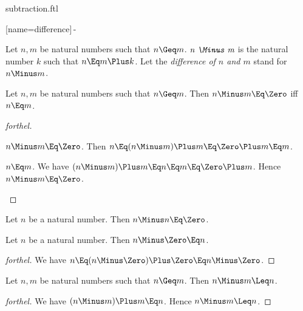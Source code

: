 \documentclass{stex}
\begin{document}
\begin{smodule}{subtraction.ftl}


[name=difference]{\,-\,}


\begin{definition*}[forthel,for=difference]
  Let $n, m$ be natural numbers such that $n \Geq m$.
  $\emph{n \Minus m}$ is the natural number $k$ such that $n \Eq m \Plus k$.
  Let the \emph{difference of $n$ and $m$} stand for $n \Minus m$.
\end{definition*}

\begin{proposition*}[forthel]
  Let $n, m$ be natural numbers such that $n \Geq m$.
  Then $n \Minus m \Eq \Zero$ iff $n \Eq m$.
\end{proposition*}
\begin{proof}[forthel]
  \begin{case}{$n \Minus m \Eq \Zero$.}
    Then $n
      \Eq (n \Minus m) \Plus m
      \Eq \Zero \Plus m
      \Eq m$.
  \end{case}

  \begin{case}{$n \Eq m$.}
    We have $(n \Minus m) \Plus m
      \Eq n
      \Eq m
      \Eq \Zero \Plus m$.
    Hence $n \Minus m \Eq \Zero$.
  \end{case}
\end{proof}

\begin{proposition*}[forthel]
  Let $n$ be a natural number.
  Then $n \Minus n \Eq \Zero$.
\end{proposition*}

\begin{proposition*}[forthel]
  Let $n$ be a natural number.
  Then $n \Minus \Zero \Eq n$.
\end{proposition*}
\begin{proof}[forthel]
  We have $n
    \Eq (n \Minus \Zero) \Plus \Zero
    \Eq n \Minus \Zero$.
\end{proof}

\begin{proposition*}[forthel]
  Let $n, m$ be natural numbers such that $n \Geq m$.
  Then $n \Minus m \Leq n$.
\end{proposition*}
\begin{proof}[forthel]
  We have $(n \Minus m) \Plus m \Eq n$.
  Hence $n \Minus m \Leq n$.
\end{proof}


\end{smodule}
\end{document}
